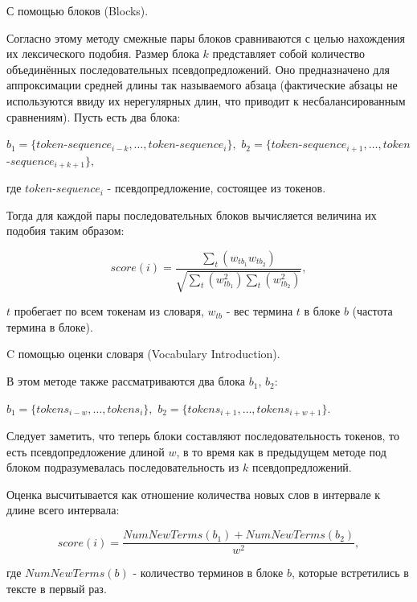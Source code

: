 \documentclass[12pt]{article}
\begin{document}
\par\begin{itemize}{
		\item С помощью блоков (Blocks).
				
		Согласно этому методу смежные пары блоков сравниваются с целью нахождения их лексического подобия. Размер блока $k$ представляет собой количество объединённых последовательных псевдопредложений. Оно предназначено для аппроксимации средней длины так называемого абзаца (фактические абзацы не используются ввиду их нерегулярных длин, что приводит к несбалансированным сравнениям). Пусть есть два блока:
				
		\begin{center}
			$b_1 = \{token$-$sequence_{i-k}, \ldots, token$-$sequence_i\},$ 
			$b_2 = \{token$-$sequence_{i+1}, \ldots, token$-$sequence_{i+k+1}\},$ 
		\end{center}
		\noindent где $token$-$sequence_i$ - псевдопредложение, состоящее из токенов.
				
		Тогда для каждой пары последовательных блоков вычисляется величина их подобия таким образом: 
				
		$$score(i) = \frac{\sum_{t}(w_{tb_1}w_{tb_2})}{\sqrt{\sum_{t}(w_{tb_1}^2)\sum_{t}(w_{tb_2}^2)}},$$
				
		$t$ пробегает по всем токенам из словаря, $w_{tb}$ - вес термина $t$ в блоке $b$ (частота термина в блоке).
				
		\vspace{0.2cm}\item C помощью оценки словаря (Vocabulary Introduction).	
				
		В этом методе также рассматриваются два блока $b_1$, $b_2$:
				
		\begin{center}
			$b_1 = \{tokens_{i-w}, \ldots, tokens_i\},$ 
			$b_2 = \{tokens_{i+1}, \ldots, tokens_{i+w+1}\}$. 
		\end{center}
					
		Следует заметить, что теперь блоки составляют последовательность токенов, то есть псевдопредложение длиной $w$, в то время как в предыдущем методе под блоком подразумевалась последовательность из $k$ псевдопредложений. 
				
		Оценка высчитывается как отношение количества новых слов в интервале к длине всего интервала:
				
		\begin{center}
			$$score(i) = \frac{NumNewTerms(b_1) + NumNewTerms(b_2)}{w^2},$$
		\end{center}
		\noindent где $NumNewTerms(b)$ - количество терминов в блоке $b$, которые встретились в тексте в первый раз.
}\end{itemize}
	
\end{document}
